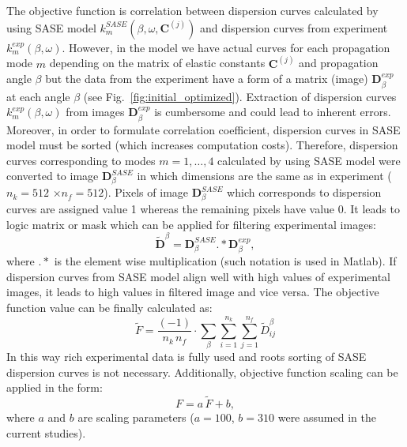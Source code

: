 \documentclass[preprint,12pt]{elsarticle}
\newcommand{\matr}[1]{\mathbf{#1}} %
\begin{document}
	The objective function is correlation between dispersion curves calculated by using SASE model $k^{SASE}_{m}(\beta, \omega,\matr{C}^{(j)})$ and dispersion curves from experiment $k^{exp}_{m}(\beta,\omega)$. However, in the model we have actual curves for each propagation mode $m$ depending on the matrix of elastic constants $\matr{C}^{(j)}$ and propagation angle $\beta$ but the data from the experiment have a form of a matrix (image) $\matr{D}^{exp}_{\beta}$ at each angle $\beta$ (see Fig.~\ref{fig:initial_optimized}). Extraction of dispersion curves $k^{exp}_{m}(\beta,\omega)$ from images $\matr{D}^{exp}_{\beta}$ is cumbersome and could lead to inherent errors. Moreover, in order to formulate correlation coefficient, dispersion curves in SASE model must be sorted (which increases computation costs). Therefore, dispersion curves corresponding to modes $m=1,\ldots, 4$ calculated by using SASE model were converted to image $\matr{D}^{SASE}_{\beta} $ in which dimensions are the same as in experiment ($n_k=512$ $\times$$n_f= 512$). Pixels of image $\matr{D}^{SASE}_{\beta} $ which corresponds to dispersion curves are assigned value 1 whereas the remaining pixels have value 0. It leads to logic matrix or mask which can be applied for filtering experimental images: 
	\begin{equation}
		\tilde{\matr{D}}^{\beta} =  \matr{D}^{SASE}_{\beta}  .*    \matr{D}^{exp}_{\beta} ,
   \end{equation}	
    where $.*$ is the element wise multiplication (such notation is used in Matlab). If dispersion curves from SASE model align well with high values of experimental images, it leads to high values in filtered image and vice versa.
	The objective function value can be finally calculated as: 
	\begin{equation}
	\tilde{F} = \frac{(-1)}{n_k \, n_f}  \cdot \sum_{\beta}  \sum_{i=1}^{n_k} \sum_{j=1}^{n_f}	\tilde{D}_{ij}^{\beta} 
	\end{equation}
	In this way rich experimental data is fully used and roots sorting of SASE dispersion curves is not necessary. Additionally, objective function scaling can be applied in the form:
	\begin{equation}
	F = a \,  \tilde{F} + b,
	\end{equation}
	where $a$ and $b$ are scaling parameters ($a=100$, $b=310$ were assumed in the current studies).
	
\end{document}
